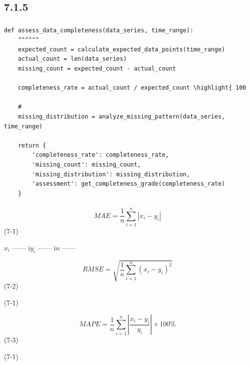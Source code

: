 \hypertarget{section-75}{%
\subsection{7.1.5}\label{section-75}}

\hypertarget{section-76}{%
\subsubsection{}\label{section-76}}

\hypertarget{section-77}{%
\paragraph{}\label{section-77}}

\begin{lstlisting}[style=python]
def assess_data_completeness(data_series, time_range):
    """"""
    expected_count = calculate_expected_data_points(time_range)
    actual_count = len(data_series)
    missing_count = expected_count - actual_count
    
    completeness_rate = actual_count / expected_count \highlight{ 100
    
    # 
    missing_distribution = analyze_missing_pattern(data_series, time_range)
    
    return {
        'completeness_rate': completeness_rate,
        'missing_count': missing_count,
        'missing_distribution': missing_distribution,
        'assessment': get_completeness_grade(completeness_rate)
    }
\end{lstlisting}

\hypertarget{section-78}{%
\paragraph{}\label{section-78}}


\[MAE = \frac{1}{n}\sum_{i=1}^{n}|x_i - y_i|\] (7-1)

\(x_i\) ------ i\(y_i\) ------ i\(n\) ------


\[RMSE = \sqrt{\frac{1}{n}\sum_{i=1}^{n}(x_i - y_i)^2}\] (7-2)

(7-1)


\[MAPE = \frac{1}{n}\sum_{i=1}^{n}\left|\frac{x_i - y_i}{y_i}\right| \times 100\%\]
(7-3)

(7-1)

